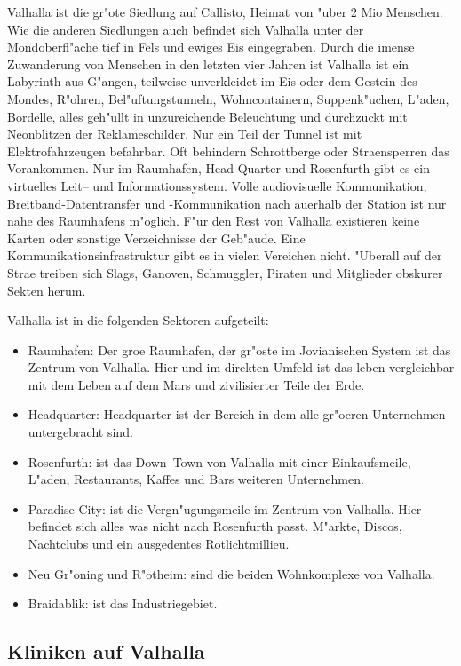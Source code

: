 Valhalla ist die gr"o\3te Siedlung auf Callisto, Heimat von "uber 2 Mio Menschen. Wie die anderen Siedlungen auch befindet sich Valhalla unter der Mondoberfl"ache tief in Fels und ewiges Eis eingegraben. Durch die imense Zuwanderung von Menschen in den letzten vier Jahren ist Valhalla ist ein Labyrinth aus G"angen, teilweise unverkleidet im Eis oder dem Gestein des Mondes, R"ohren, Bel"uftungstunneln, Wohncontainern, Suppenk"uchen, L"aden, Bordelle, alles geh"ullt in unzureichende Beleuchtung und durchzuckt mit Neonblitzen der Reklameschilder. Nur ein Teil der Tunnel ist mit Elektrofahrzeugen befahrbar. Oft behindern Schrottberge oder Stra\3ensperren das Vorankommen. Nur im Raumhafen, Head Quarter und Rosenfurth gibt es ein virtuelles Leit-- und Informationssystem. Volle audiovisuelle Kommunikation, Breitband-Datentransfer und -Kommunikation nach au\3erhalb der Station ist nur nahe des Raumhafens m"oglich. F"ur den Rest von Valhalla existieren keine Karten oder sonstige Verzeichnisse der Geb"aude. Eine Kommunikationsinfrastruktur gibt es in vielen Vereichen nicht. "Uberall auf der Stra\3e treiben sich Slags, Ganoven, Schmuggler, Piraten  und Mitglieder obskurer Sekten herum.

Valhalla ist in die folgenden Sektoren aufgeteilt:

\begin{itemize}
    \item Raumhafen: Der gro\3e Raumhafen, der gr"oste im Jovianischen System ist das Zentrum von Valhalla. Hier und im direkten Umfeld ist das leben vergleichbar mit dem Leben auf dem Mars und zivilisierter Teile der Erde.
    \item Headquarter: Headquarter ist der Bereich in dem alle gr"o\3eren Unternehmen untergebracht sind.
    \item Rosenfurth: ist das Down--Town  von Valhalla mit einer Einkaufsmeile, L"aden, Restaurants, Kaffes und Bars weiteren Unternehmen.
    \item Paradise City: ist die Vergn"ugungsmeile im Zentrum von Valhalla. Hier befindet sich alles was nicht nach Rosenfurth passt. M"arkte, Discos, Nachtclubs und ein ausgedentes Rotlichtmillieu.
    \item Neu Gr"oning und R"otheim: sind die beiden Wohnkomplexe von Valhalla.
    \item Braidablik: ist das Industriegebiet.
\end{itemize}

\subsection{Kliniken auf Valhalla}

